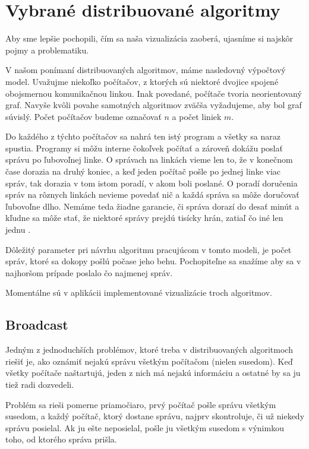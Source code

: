 \section{Vybrané distribuované algoritmy}
Aby sme lepšie pochopili, čím sa naša vizualizácia zaoberá, ujasníme si najskôr pojmy a problematiku.

V našom ponímaní distribuovaných algoritmov, máme nasledovný výpočtový model.
Uvažujme niekoľko počítačov, z ktorých sú niektoré dvojice spojené obojsmernou komunikačnou linkou.
Inak povedané, počítače tvoria neorientovaný graf. Navyše kvôli povahe samotných algoritmov zväčša vyžadujeme,
aby bol graf súvislý. Počet počítačov budeme označovať $n$ a počet liniek $m$.

Do každého z týchto počítačov sa nahrá ten istý program a všetky sa naraz spustia. Programy si môžu
interne čokoľvek počítať a zároveň dokážu poslať správu po ľubovoľnej linke. O správach na linkách
vieme len to, že v konečnom čase dorazia na druhý koniec, a keď jeden počítač pošle po jednej linke
viac správ, tak dorazia v tom istom poradí, v akom boli poslané. O poradí doručenia správ na rôznych
linkách nevieme povedať nič a každá správa sa môže doručovať ľubovoľne dlho. Nemáme teda žiadne garancie, či
správa dorazí do desať minút a kľudne sa môže stať, že niektoré správy prejdú tisícky hrán, zatiaľ čo
iné len jednu \cite{tel2000}.

Dôležitý parameter pri návrhu algoritmu pracujúcom v tomto modeli, je počet správ, ktoré sa dokopy
pošlú počase jeho behu. Pochopiteľne sa snažíme aby sa v najhoršom prípade poslalo čo najmenej
správ.

Momentálne sú v aplikácii implementované vizualizácie troch algoritmov.

\subsection{Broadcast}

Jedným z jednoduchších problémov, ktoré treba v distribuovaných algoritmoch riešiť je, ako 
oznámiť nejakú správu všetkým počítačom (nielen susedom). Keď všetky počítače naštartujú, 
jeden z nich má nejakú informáciu a ostatné by sa ju tiež radi dozvedeli.

Problém sa rieši pomerne priamočiaro, prvý počítač pošle správu všetkým susedom, a každý
počítač, ktorý dostane správu, najprv skontroluje, či už niekedy správu posielal. 
Ak ju ešte neposielal, pošle ju všetkým susedom s výnimkou toho, od ktorého správa prišla.

